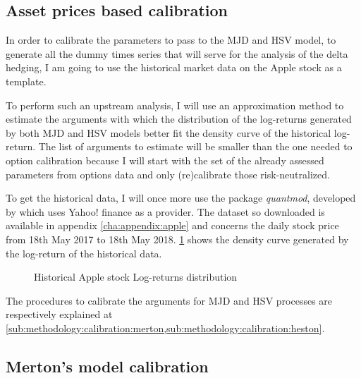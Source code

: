 \documentclass[12pt]{report}
\begin{document}

\subsection{Asset prices based calibration}
\label{sub:methodology:calibration:asset}

In order to calibrate the parameters to pass to the MJD and HSV model, to generate all the dummy times series that will serve for the analysis of the delta hedging, I am going to use the historical market data on the Apple stock as a template.

To perform such an upstream analysis, I will use an approximation method to estimate the arguments with which the distribution of the log-returns generated by both MJD and HSV models better fit the density curve of the historical log-return.
The list of arguments to estimate will be smaller than the one needed to option calibration because I will start with the set of the already assessed parameters from options data and only (re)calibrate those risk-neutralized.

To get the historical data, I will once more use the package \textit{quantmod}, developed by \citet{quantmod} which uses Yahoo! finance as a provider. The dataset so downloaded is available in appendix \ref{cha:appendix:apple} and concerns the daily stock price from 18th May 2017 to 18th May 2018.
\cref{p:methodology:density:aapl} shows the density curve generated by the log-return of the historical data.

\begin{figure}[ht]
  \centering
  
  \caption{Historical Apple stock Log-returns distribution}
  \label{p:methodology:density:aapl}
\end{figure}


The procedures to calibrate the arguments for MJD and HSV processes are respectively explained at \cref{sub:methodology:calibration:merton,sub:methodology:calibration:heston}.



\subsection{Merton's model calibration}
\label{sub:methodology:calibration:merton}
\end{document}
